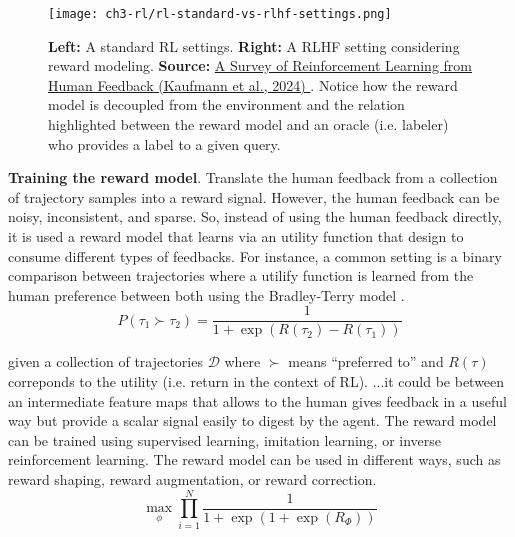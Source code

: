 \begin{figure}[ht]
    \centering
    \texttt{[image: ch3-rl/rl-standard-vs-rlhf-settings.png]}
    \captionsetup{width=\textwidth} %
    \caption{\textbf{Left:} A standard RL settings. \textbf{Right:} A RLHF setting considering reward modeling. \textbf{Source:} \href{https://arxiv.org/abs/2312.14925}{A Survey of Reinforcement Learning from Human Feedback (Kaufmann et al., 2024) \cite{kaufmann2023survey}}. Notice how the reward model is decoupled from the environment and the relation highlighted between the reward model and an oracle (i.e. labeler) who provides a label to a given query.}
    \label{fig:rlhf-setting}
  \end{figure}

\noindent \textbf{Training the reward model}. Translate the human feedback 
from a collection of trajectory samples into a reward signal. However,
the human feedback can be noisy, inconsistent, and sparse. So, instead of
using the human feedback directly, it is used a reward model that learns
via an utility function that design to consume different types of feedbacks. For instance, a common setting is a binary comparison between trajectories where a utilify function is learned from the human preference between both using the Bradley-Terry model \cite{bradley-terry-model}. \\

\begin{equation*}
P(\tau_{1}\succ\tau_{2}) = \frac{1}{1 + \exp(R(\tau_{2}) - R(\tau_{1}))}
\end{equation*}

\noindent given a collection of trajectories $\mathcal{D}$ where $\succ$ means ``preferred to'' and $R(\tau)$ correponds to the utility (i.e. return in the context of RL). ...it could be between an intermediate feature maps that allows to the human gives feedback in a useful way but provide a scalar signal easily to digest by the agent. The reward model can be trained using supervised learning, imitation learning, or inverse reinforcement learning. The reward model can be used in different ways, such as reward shaping, reward augmentation, or reward correction. \\

\begin{equation}
    \underset{\phi}{\max} \prod_{i=1}^{N}\frac{1}{1 + \exp\left(1 + \exp(R_{\Phi}) \right)}
\end{equation}


